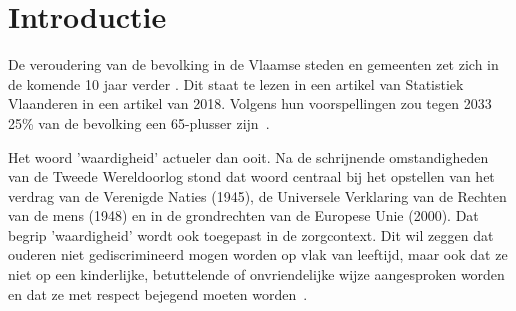 

\section{Introductie} %
\label{sec:introductie}

De veroudering van de bevolking in de Vlaamse steden en gemeenten zet zich in de komende 10 jaar verder \autocite{StatistiekVlaanderen2018}. Dit staat te lezen in een artikel van Statistiek Vlaanderen in een artikel van 2018. Volgens hun voorspellingen zou tegen 2033 25\% van de bevolking een 65-plusser zijn~\autocite{StatistiekVlaanderen2018}.

Het woord 'waardigheid' actueler dan ooit. Na de schrijnende omstandigheden van de Tweede Wereldoorlog stond dat woord centraal bij het opstellen van het verdrag van de Verenigde Naties (1945), de Universele Verklaring van de Rechten van de mens (1948) en in de grondrechten van de Europese Unie (2000). Dat begrip 'waardigheid' wordt ook toegepast in de zorgcontext. Dit wil zeggen dat ouderen niet gediscrimineerd mogen worden op vlak van leeftijd, maar ook dat ze niet op een kinderlijke, betuttelende of onvriendelijke wijze aangesproken worden en dat ze met respect bejegend moeten worden~\autocite{Campens}.

